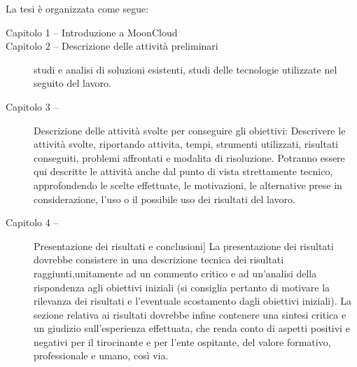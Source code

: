 La tesi \`e organizzata come segue:
\begin{description}
    \item[Capitolo 1 -- Introduzione a MoonCloud]
    \item[Capitolo 2 -- Descrizione delle attività preliminari] studi e analisi di soluzioni esistenti, studi delle tecnologie utilizzate
    nel seguito del lavoro.
    \item[Capitolo 3 -- ] Descrizione delle attività svolte per conseguire gli obiettivi: Descrivere le attività svolte, 
    riportando attivita, tempi, strumenti utilizzati, risultati conseguiti, problemi affrontati e modalita di risoluzione. 
    Potranno essere qui descritte le attività anche dal punto di vista strettamente tecnico, approfondendo le scelte effettuate, 
    le motivazioni, le alternative prese in considerazione, l’uso o il possibile uso dei risultati del lavoro.
    \item[Capitolo 4 -- ] Presentazione dei risultati e conclusioni] La presentazione dei risultati dovrebbe consistere in una 
    descrizione tecnica dei risultati raggiunti,unitamente ad un commento critico e ad un’analisi della rispondenza agli 
    obiettivi iniziali (si consiglia pertanto di motivare 
    la rilevanza dei risultati e l’eventuale scostamento dagli obiettivi iniziali). La sezione relativa ai risultati dovrebbe 
    infine contenere una sintesi critica e un giudizio sull’esperienza effettuata, che renda conto di aspetti positivi e negativi
    per il tirocinante e per l’ente ospitante, del valore formativo, professionale e umano, così via.
\end{description}




